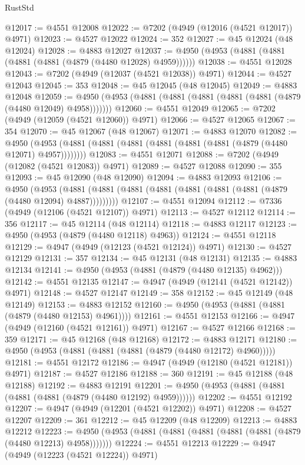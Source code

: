 \begin{lexlean}{RustStd}
\begin{coremodule}
@12017 := @4551 @12008
@12022 := @7202 (@4949 (@12016 (@4521 @12017)) @4971)
@12023 := @4527 @12022
@12024 := 352
@12027 := @45 @12024 (@48 @12024)
@12028 := @4883 @12027
@12037 := @4950 (@4953 (@4881 (@4881 (@4881 (@4881 (@4879 (@4480 @12028) @4959))))))
@12038 := @4551 @12028
@12043 := @7202 (@4949 (@12037 (@4521 @12038)) @4971)
@12044 := @4527 @12043
@12045 := 353
@12048 := @45 @12045 (@48 @12045)
@12049 := @4883 @12048
@12059 := @4950 (@4953 (@4881 (@4881 (@4881 (@4881 (@4881 (@4879 (@4480 @12049) @4958)))))))
@12060 := @4551 @12049
@12065 := @7202 (@4949 (@12059 (@4521 @12060)) @4971)
@12066 := @4527 @12065
@12067 := 354
@12070 := @45 @12067 (@48 @12067)
@12071 := @4883 @12070
@12082 := @4950 (@4953 (@4881 (@4881 (@4881 (@4881 (@4881 (@4881 (@4879 (@4480 @12071) @4957))))))))
@12083 := @4551 @12071
@12088 := @7202 (@4949 (@12082 (@4521 @12083)) @4971)
@12089 := @4527 @12088
@12090 := 355
@12093 := @45 @12090 (@48 @12090)
@12094 := @4883 @12093
@12106 := @4950
    (@4953 (@4881 (@4881 (@4881 (@4881 (@4881 (@4881 (@4881 (@4879 (@4480 @12094) @4887)))))))))
@12107 := @4551 @12094
@12112 := @7336 (@4949 (@12106 (@4521 @12107)) @4971)
@12113 := @4527 @12112
@12114 := 356
@12117 := @45 @12114 (@48 @12114)
@12118 := @4883 @12117
@12123 := @4950 (@4953 (@4879 (@4480 @12118) @4963))
@12124 := @4551 @12118
@12129 := @4947 (@4949 (@12123 (@4521 @12124)) @4971)
@12130 := @4527 @12129
@12131 := 357
@12134 := @45 @12131 (@48 @12131)
@12135 := @4883 @12134
@12141 := @4950 (@4953 (@4881 (@4879 (@4480 @12135) @4962)))
@12142 := @4551 @12135
@12147 := @4947 (@4949 (@12141 (@4521 @12142)) @4971)
@12148 := @4527 @12147
@12149 := 358
@12152 := @45 @12149 (@48 @12149)
@12153 := @4883 @12152
@12160 := @4950 (@4953 (@4881 (@4881 (@4879 (@4480 @12153) @4961))))
@12161 := @4551 @12153
@12166 := @4947 (@4949 (@12160 (@4521 @12161)) @4971)
@12167 := @4527 @12166
@12168 := 359
@12171 := @45 @12168 (@48 @12168)
@12172 := @4883 @12171
@12180 := @4950 (@4953 (@4881 (@4881 (@4881 (@4879 (@4480 @12172) @4960)))))
@12181 := @4551 @12172
@12186 := @4947 (@4949 (@12180 (@4521 @12181)) @4971)
@12187 := @4527 @12186
@12188 := 360
@12191 := @45 @12188 (@48 @12188)
@12192 := @4883 @12191
@12201 := @4950 (@4953 (@4881 (@4881 (@4881 (@4881 (@4879 (@4480 @12192) @4959))))))
@12202 := @4551 @12192
@12207 := @4947 (@4949 (@12201 (@4521 @12202)) @4971)
@12208 := @4527 @12207
@12209 := 361
@12212 := @45 @12209 (@48 @12209)
@12213 := @4883 @12212
@12223 := @4950 (@4953 (@4881 (@4881 (@4881 (@4881 (@4881 (@4879 (@4480 @12213) @4958)))))))
@12224 := @4551 @12213
@12229 := @4947 (@4949 (@12223 (@4521 @12224)) @4971)

\end{coremodule}
\end{lexlean}
